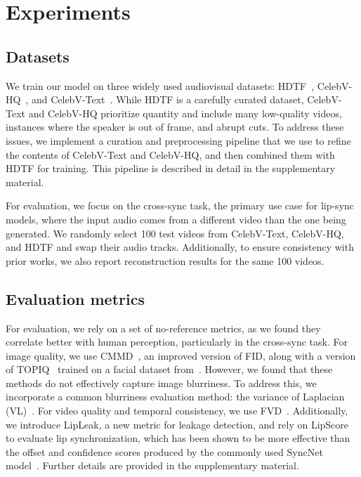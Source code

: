 \section{Experiments}
\label{sec:experiments}

\subsection{Datasets}

We train our model on three widely used audiovisual datasets: HDTF~\cite{hdtf}, CelebV-HQ~\cite{zhu2022celebvhq}, and CelebV-Text~\cite{yu2022celebvtext}. While HDTF is a carefully curated dataset, CelebV-Text and CelebV-HQ prioritize quantity and include many low-quality videos, instances where the speaker is out of frame, and abrupt cuts. To address these issues, we implement a curation and preprocessing pipeline that we use to refine the contents of CelebV-Text and CelebV-HQ, and then combined them with HDTF for training. This pipeline is described in detail in the supplementary material.

For evaluation, we focus on the cross-sync task, the primary use case for lip-sync models, where the input audio comes from a different video than the one being generated. We randomly select 100 test videos from CelebV-Text, CelebV-HQ, and HDTF and swap their audio tracks. Additionally, to ensure consistency with prior works, we also report reconstruction results for the same 100 videos.


\subsection{Evaluation metrics}
\label{sec:metrics}

For evaluation, we rely on a set of no-reference metrics, as we found they correlate better with human perception, particularly in the cross-sync task. For image quality, we use CMMD~\cite{cmmd}, an improved version of FID, along with a version of TOPIQ~\cite{topiq} trained on a facial dataset from~\cite{pyiqa}. However, we found that these methods do not effectively capture image blurriness. To address this, we incorporate a common blurriness evaluation method: the variance of Laplacian (VL)~\cite{laplacian}. For video quality and temporal consistency, we use FVD~\cite{fvd}. Additionally, we introduce LipLeak, a new metric for leakage detection, and rely on LipScore~\cite{keyface} to evaluate lip synchronization, which has been shown to be more effective than the offset and confidence scores produced by the commonly used SyncNet model~\cite{Prajwal}. Further details are provided in the supplementary material.

